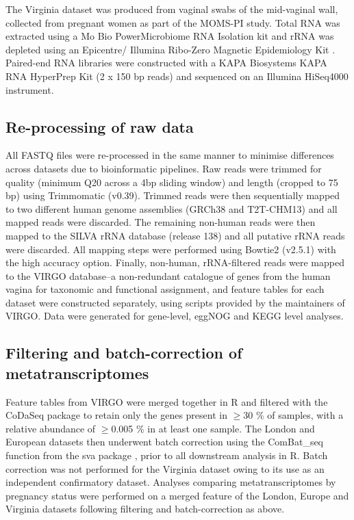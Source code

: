 \documentclass[sn-mathphys,Numbered]{sn-jnl}%
\begin{document}
The Virginia dataset was produced from vaginal swabs of the mid-vaginal wall, collected from pregnant women as part of the MOMS-PI study. Total RNA was extracted using a Mo Bio PowerMicrobiome RNA Isolation kit and rRNA was depleted using an Epicentre/ Illumina Ribo-Zero Magnetic Epidemiology Kit \citep{Fettweis:2019aa}. Paired-end RNA libraries were constructed with a KAPA Biosystems KAPA RNA HyperPrep Kit (2 x 150 bp reads) and sequenced on an Illumina HiSeq4000 instrument.

\subsection{Re-processing of raw data}\label{subsec:subsecReprocessing}
All FASTQ files were re-processed in the same manner to minimise differences across datasets due to bioinformatic pipelines. Raw reads were trimmed for quality (minimum Q20 across a 4bp sliding window) and length (cropped to 75 bp) using Trimmomatic (v0.39). Trimmed reads were then sequentially mapped to two different human genome assemblies (GRCh38 and T2T-CHM13) and all mapped reads were discarded. The remaining non-human reads were then mapped to the SILVA rRNA database (release 138) and all putative rRNA reads were discarded. All mapping steps were performed using Bowtie2 (v2.5.1) with the high accuracy option. Finally, non-human, rRNA-filtered reads were mapped to the VIRGO database--a non-redundant catalogue of genes from the human vagina \cite{Ma:2020aa} for taxonomic and functional assignment, and feature tables for each dataset were constructed separately, using scripts provided by the maintainers of VIRGO. Data were generated for gene-level, eggNOG \cite{Huerta-Cepas:2019uf} and KEGG \cite{Kanehisa:2010} level analyses. 

\subsection{Filtering and batch-correction of metatranscriptomes}\label{subsec:subsecAnalysis}
Feature tables from VIRGO were merged together in R and filtered with the CoDaSeq package to retain only the genes present in $\geq$30 \% of samples, with a relative abundance of $\geq$0.005 \% in at least one sample. The London and European datasets then underwent batch correction using the ComBat\_seq function from the sva package \cite{Zhang:2020ab}, prior to all downstream analysis in R. Batch correction was not performed for the Virginia dataset owing to its use as an independent confirmatory dataset. Analyses comparing metatranscriptomes by pregnancy status were performed on a merged feature of the London, Europe and Virginia datasets following filtering and batch-correction as above.
\end{document}
